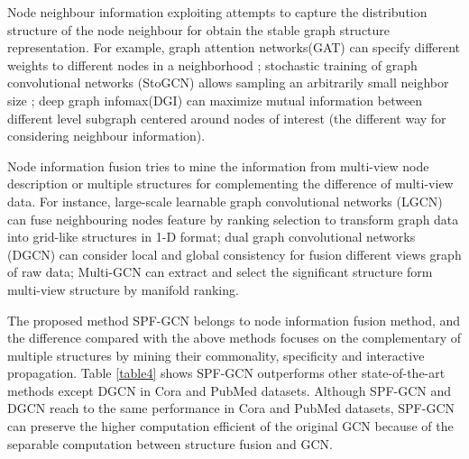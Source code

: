 \documentclass[review]{elsarticle}
\begin{document}
Node neighbour information exploiting attempts to capture the distribution structure of the node neighbour for obtain the stable graph structure representation. For example, graph attention networks(GAT) can specify different weights to different nodes in a neighborhood \cite{Veli2017Graph}; stochastic training of graph convolutional networks (StoGCN) allows sampling an arbitrarily small neighbor size \cite{2017arXiv171010568C}; deep graph infomax(DGI) can maximize mutual information between different level subgraph centered around nodes of interest (the different way for considering neighbour information)\cite{Veli2018Deep}.

Node information fusion tries to mine the information from multi-view node description or multiple structures for complementing the difference of multi-view data. For instance, large-scale learnable graph convolutional networks (LGCN) can fuse neighbouring nodes feature by ranking selection to transform graph data into grid-like structures in 1-D format\cite{2018arXiv180803965G}; dual graph convolutional networks (DGCN) can consider local and global consistency for fusion different views graph of raw data\cite{zhuang2018dual}; Multi-GCN can extract and select the significant structure form multi-view structure by manifold ranking\cite{khan2019multi}.

The proposed method SPF-GCN belongs to node information fusion method, and the difference compared with the above methods focuses on the complementary of multiple structures by mining their commonality, specificity and interactive propagation. Table \ref{table4} shows SPF-GCN outperforms other state-of-the-art methods except DGCN in Cora and PubMed datasets. Although SPF-GCN and DGCN reach to the same performance in Cora and PubMed datasets, SPF-GCN can preserve the higher computation efficient of the original GCN because of the separable computation between structure fusion and GCN.
\end{document}
